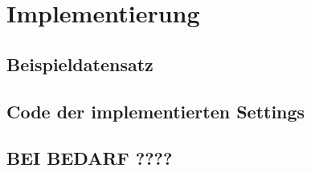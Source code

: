 \chapter{Implementierung}
\section{Beispieldatensatz}

\section{Code der implementierten Settings}

\section{BEI BEDARF ????}